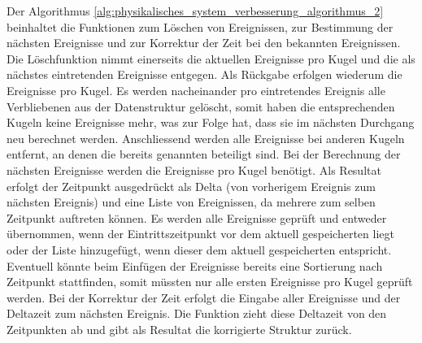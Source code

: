 \newpage
Der Algorithmus \ref{alg:physikalisches_system_verbesserung_algorithmus_2} beinhaltet die Funktionen zum Löschen von
Ereignissen, zur Bestimmung der nächsten Ereignisse und zur Korrektur der Zeit bei den bekannten Ereignissen.
Die Löschfunktion nimmt einerseits die aktuellen Ereignisse pro Kugel und die als nächstes eintretenden Ereignisse
entgegen. Als Rückgabe erfolgen wiederum die Ereignisse pro Kugel. Es werden nacheinander pro eintretendes Ereignis
alle Verbliebenen aus der Datenstruktur gelöscht, somit haben die entsprechenden Kugeln keine Ereignisse mehr, was
zur Folge hat, dass sie im nächsten Durchgang neu berechnet werden. Anschliessend werden alle Ereignisse bei anderen
Kugeln entfernt, an denen die bereits genannten beteiligt sind. Bei der Berechnung der nächsten Ereignisse werden
die Ereignisse pro Kugel benötigt. Als Resultat erfolgt der Zeitpunkt ausgedrückt als Delta (von vorherigem
Ereignis zum nächsten Ereignis) und eine Liste von Ereignissen, da mehrere zum selben Zeitpunkt
auftreten können. Es werden alle Ereignisse geprüft und entweder übernommen, wenn der Eintrittszeitpunkt vor dem
aktuell gespeicherten liegt oder der Liste hinzugefügt, wenn dieser dem aktuell gespeicherten entspricht.
Eventuell könnte beim Einfügen der Ereignisse bereits eine Sortierung nach Zeitpunkt stattfinden, somit müssten nur
alle ersten Ereignisse pro Kugel geprüft werden. Bei der Korrektur der Zeit erfolgt die Eingabe
aller Ereignisse und der Deltazeit zum nächsten Ereignis. Die Funktion zieht diese Deltazeit von den
Zeitpunkten ab und gibt als Resultat die korrigierte Struktur zurück.
